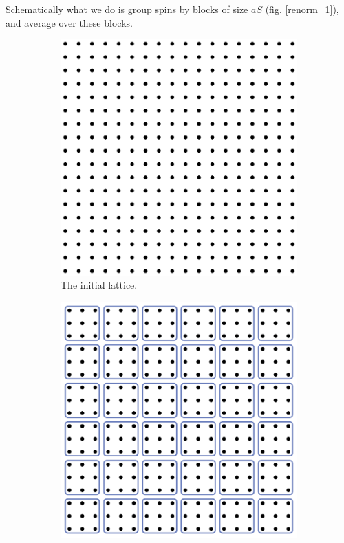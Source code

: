 Schematically what we do is group spins by blocks of size $a S$ (fig. \eqref{renorm_1}), and average over these blocks.

\begin{figure}[htp]
\centering
\begin{subfigure}{.25\textwidth}
	\centering
	\includegraphics[width=.9\linewidth]{img/chap2/renorm_step0.pdf}
	\caption{The initial lattice.}
	\label{renorm_0}
	\end{subfigure}%
\begin{subfigure}{.25\textwidth}
	\centering
	\includegraphics[width=.9\linewidth]{img/chap2/renorm_step1.pdf}

\end{subfigure}
\end{figure}
